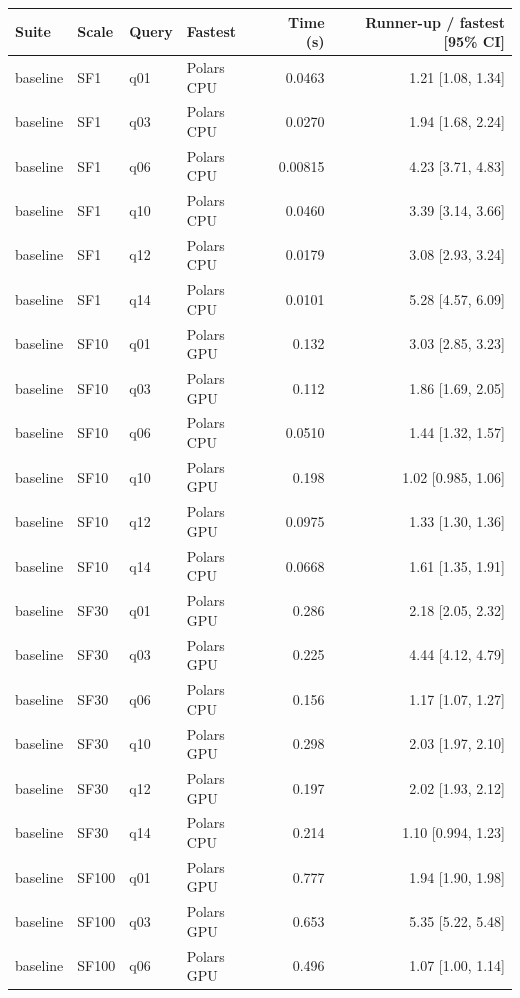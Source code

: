 \begin{longtable}{llllrr}
\toprule
Suite & Scale & Query & Fastest & Time (s) & Runner-up / fastest [95\% CI] \\
\midrule
\endhead
\bottomrule
\endfoot
baseline & SF1 & q01 & Polars CPU & 0.0463 & 1.21 [1.08, 1.34] \\
baseline & SF1 & q03 & Polars CPU & 0.0270 & 1.94 [1.68, 2.24] \\
baseline & SF1 & q06 & Polars CPU & 0.00815 & 4.23 [3.71, 4.83] \\
baseline & SF1 & q10 & Polars CPU & 0.0460 & 3.39 [3.14, 3.66] \\
baseline & SF1 & q12 & Polars CPU & 0.0179 & 3.08 [2.93, 3.24] \\
baseline & SF1 & q14 & Polars CPU & 0.0101 & 5.28 [4.57, 6.09] \\
baseline & SF10 & q01 & Polars GPU & 0.132 & 3.03 [2.85, 3.23] \\
baseline & SF10 & q03 & Polars GPU & 0.112 & 1.86 [1.69, 2.05] \\
baseline & SF10 & q06 & Polars CPU & 0.0510 & 1.44 [1.32, 1.57] \\
baseline & SF10 & q10 & Polars GPU & 0.198 & 1.02 [0.985, 1.06] \\
baseline & SF10 & q12 & Polars GPU & 0.0975 & 1.33 [1.30, 1.36] \\
baseline & SF10 & q14 & Polars CPU & 0.0668 & 1.61 [1.35, 1.91] \\
baseline & SF30 & q01 & Polars GPU & 0.286 & 2.18 [2.05, 2.32] \\
baseline & SF30 & q03 & Polars GPU & 0.225 & 4.44 [4.12, 4.79] \\
baseline & SF30 & q06 & Polars CPU & 0.156 & 1.17 [1.07, 1.27] \\
baseline & SF30 & q10 & Polars GPU & 0.298 & 2.03 [1.97, 2.10] \\
baseline & SF30 & q12 & Polars GPU & 0.197 & 2.02 [1.93, 2.12] \\
baseline & SF30 & q14 & Polars CPU & 0.214 & 1.10 [0.994, 1.23] \\
baseline & SF100 & q01 & Polars GPU & 0.777 & 1.94 [1.90, 1.98] \\
baseline & SF100 & q03 & Polars GPU & 0.653 & 5.35 [5.22, 5.48] \\
baseline & SF100 & q06 & Polars GPU & 0.496 & 1.07 [1.00, 1.14] \\

\end{longtable}
